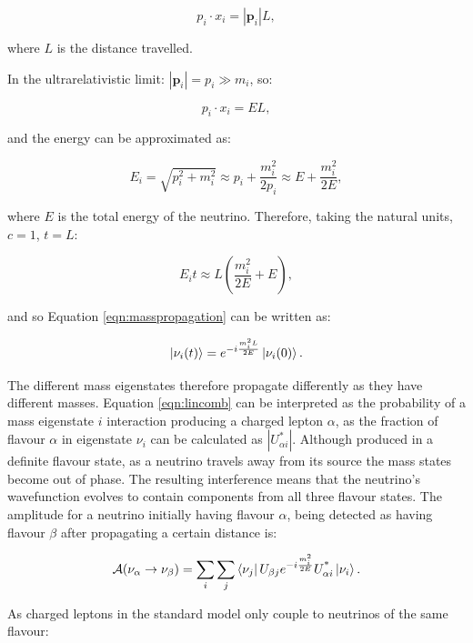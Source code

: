 \begin{equation}
p_i\cdot x_i = |\mathbf{p}_i|L,
\end{equation}

where $L$ is the distance travelled.

In the ultrarelativistic limit: $|\mathbf{p}_i| = p_i \gg m_i$, so:

\begin{equation}
 p_i\cdot x_i  = EL,
\end{equation}

and the energy can be approximated as:

\begin{equation}
E_{i} = \sqrt{p_i^2 + m_i^2} \approx p_i + \frac{m_i^2}{2p_i} \approx E + \frac{m_i^2}{2E},
\end{equation}

where $E$ is the total energy of the neutrino. Therefore, taking the natural units, $c=1$, $t=L$:

\begin{equation}
E_i t\approx L(\frac{m_i^2}{2E}+E),
\end{equation}

and so Equation \eqref{eqn:masspropagation} can be written as:

\begin{equation}
\ket{\nu_{i}(t)}=e^{-i\frac{m_i^2L}{2E}}\ket{\nu_i(0)}.
\end{equation}

The different mass eigenstates therefore propagate differently as they have different masses. Equation \eqref{eqn:lincomb} can be interpreted as the probability of a mass eigenstate $i$ interaction producing a charged lepton $\alpha$, as the fraction of flavour $\alpha$ in eigenstate $\nu_i$ can be calculated as $|U^\text{*}_{\alpha i}|$.  Although produced in a definite flavour state, as a neutrino travels away from its source the mass states become out of phase. The resulting interference means that the neutrino's wavefunction evolves to contain components from all three flavour states. The amplitude for a neutrino initially having flavour $\alpha$, being detected as having flavour $\beta$ after propagating a certain distance is:

\begin{equation}
\mathcal{A}(\nu_\alpha \rightarrow \nu_\beta) = \sum_i \sum_j \bra{\nu_j}U_{\beta j}e^{-i\frac{m_i^2}{2E}}U^{\text{*}}_{\alpha i}\ket{\nu_i}.
\end{equation}

As charged leptons in the standard model only couple to neutrinos of the same flavour:


